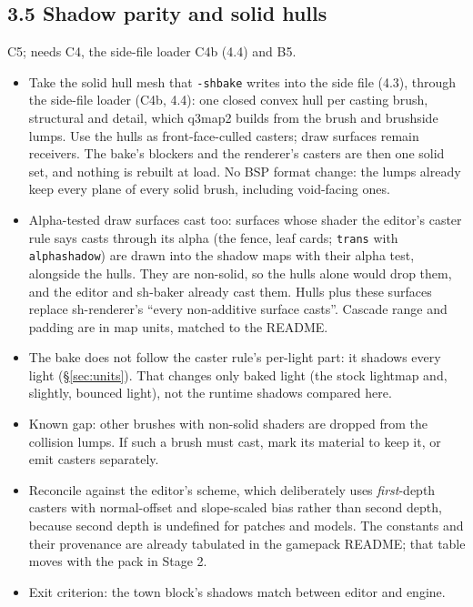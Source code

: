 \documentclass[11pt,a4paper]{article}
\begin{document}
\subsection{3.5 Shadow parity and solid hulls}
C5; needs C4, the side-file loader C4b (4.4) and B5.
\begin{itemize}
\item Take the solid hull mesh that \texttt{-shbake} writes into the side file (4.3), through the
  side-file loader (C4b, 4.4): one closed
  convex hull per casting brush, structural and detail, which q3map2 builds from the brush and
  brushside lumps. Use the hulls as front-face-culled casters; draw surfaces remain receivers. The
  bake's blockers and the renderer's casters are then one solid set, and nothing is rebuilt at
  load. No BSP format change: the lumps already keep every plane of every solid brush, including
  void-facing ones.
\item Alpha-tested draw surfaces cast too: surfaces whose shader the editor's caster rule says casts
  through its alpha (the fence, leaf cards; \texttt{trans} with \texttt{alphashadow}) are drawn into the
  shadow maps with their alpha test, alongside the hulls. They are non-solid, so the hulls alone
  would drop them, and the editor and sh-baker already cast them. Hulls plus these surfaces replace
  sh-renderer's ``every non-additive surface casts''. Cascade range and padding are in map units,
  matched to the README.
\item The bake does not follow the caster rule's per-light part: it shadows every light
  (§\ref{sec:units}). That changes only baked light (the stock lightmap and, slightly, bounced
  light), not the runtime shadows compared here.
\item Known gap: other brushes with non-solid shaders are dropped from the collision lumps. If such a
  brush must cast, mark its material to keep it, or emit casters separately.
\item Reconcile against the editor's scheme, which deliberately uses \emph{first}-depth casters
  with normal-offset and slope-scaled bias rather than second depth, because second depth is
  undefined for patches and models. The constants and their provenance are already tabulated in
  the gamepack README; that table moves with the pack in Stage 2.
\item Exit criterion: the town block's shadows match between editor and engine.
\end{itemize}
\end{document}
